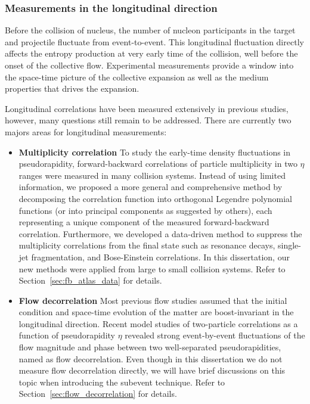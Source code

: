 \subsubsection{Measurements in the longitudinal direction}

Before the collision of nucleus, the number of nucleon participants in the target and projectile fluctuate from event-to-event. This longitudinal fluctuation directly affects the entropy production at very early time of the collision, well before the onset of the collective flow. Experimental measurements provide a window into the space-time picture of the collective expansion as well as the medium properties that drives the expansion.

Longitudinal correlations have been measured extensively in previous studies, however, many questions still remain to be addressed. There are currently two majors areas for longitudinal measurements:
\begin{itemize}
\item \textbf{Multiplicity correlation} To study the early-time density fluctuations in pseudorapidity, forward-backward correlations of particle multiplicity in two $\eta$ ranges were measured in many collision systems. Instead of using limited information, we proposed a more general and comprehensive method by decomposing the correlation function into orthogonal Legendre polynomial functions (or into principal components as suggested by others), each representing a unique component of the measured forward-backward correlation. Furthermore, we developed a data-driven method to suppress the multiplicity correlations from the final state such as resonance decays, single-jet fragmentation, and Bose-Einstein correlations. In this dissertation, our new methods were applied from large to small collision systems. Refer to Section~\ref{sec:fb_atlas_data} for details.
\item \textbf{Flow decorrelation} Most previous flow studies assumed that the initial condition and space-time evolution of the matter are boost-invariant in the longitudinal direction. Recent model studies of two-particle correlations as a function of pseudorapidity $\eta$ revealed strong event-by-event fluctuations of the flow magnitude and phase between two well-separated pseudorapidities, named as flow decorrelation. Even though in this dissertation we do not measure flow decorrelation directly, we will have brief discussions on this topic when introducing the subevent technique. Refer to Section~\ref{sec:flow_decorrelation} for details.
\end{itemize}



